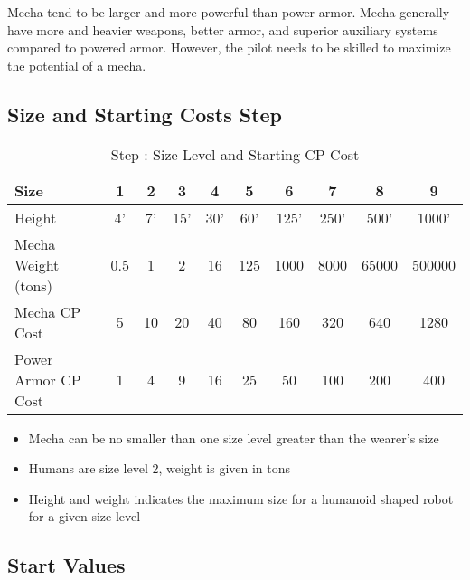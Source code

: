 Mecha tend to be larger and more powerful than power armor.  Mecha generally have more and heavier weapons, better armor, and superior auxiliary systems compared to powered armor.  However, the pilot needs to be skilled to maximize the potential of a mecha.

\setcounter{MechaSteps}{1}

\subsection{Size and Starting Costs Step }

\begin{table}[htb]
\begin{center}
\begin{tabular}{lc|c|c|c|c|c|c|c|c}
\hline
\textbf{Size} & 1 & 2 & 3 & 4 & 5 & 6 & 7 & 8 & 9 \\
\hline
\hline
Height & 4' & 7' & 15' & 30' & 60' & 125' & 250' & 500' & 1000' \\
\hline
Mecha Weight (tons) & 0.5 & 1 & 2 & 16 & 125 & 1000 & 8000 & 65000 & 500000 \\
\hline
Mecha CP Cost & 5 & 10 & 20 & 40 & 80 & 160 & 320 & 640 & 1280 \\
\hline
Power Armor CP Cost & 1 & 4 & 9 & 16 & 25 & 50 & 100 & 200 & 400 \\
\hline
\end{tabular}
\caption{Step : Size Level and Starting CP Cost}
\end{center}
\end{table}
\addtocounter{MechaSteps}{1}


\begin{itemize}
\item Mecha can be no smaller than one size level greater than the wearer's size
\item Humans are size level 2, weight is given in tons
\item Height and weight indicates the maximum size for a humanoid shaped robot for a given size level
\end{itemize}

\subsection{Start Values }

